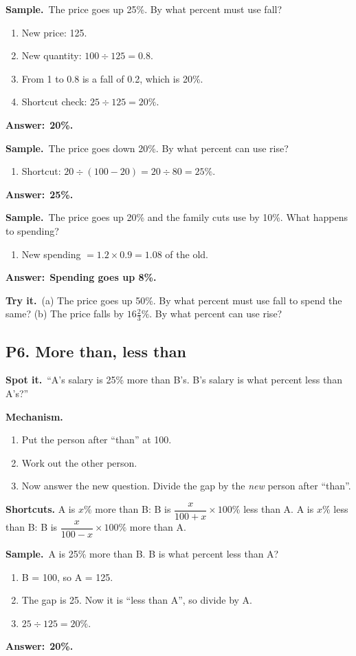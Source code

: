 \documentclass[11pt,a4paper]{article}
\let\oldsubsection\subsection
\renewcommand{\subsection}{\needspace{9\baselineskip}\oldsubsection}
\newcommand{\spot}{\textbf{\color{ember}Spot it.}\ }
\newcommand{\mech}{\textbf{\color{ember}Mechanism.}\ }
\newif\ifkeepsamp
\newcommand{\ans}[1]{\par\nopagebreak\noindent\textbf{\color{ember}Answer:}\ \textbf{#1}\par}
\newcommand{\samp}{\ifkeepsamp\needspace{4\baselineskip}\fi\textbf{\color{ember}Sample.}\ }
\newcommand{\tryit}[1]{\textbf{\color{ember}Try it.}\ #1}
\begin{document}
\samp The price goes up 25\%. By what percent must use fall?
\begin{enumerate}
\item New price: 125.
\item New quantity: $100 \div 125 = 0.8$.
\item From 1 to 0.8 is a fall of 0.2, which is 20\%.
\item Shortcut check: $25 \div 125 = 20\%$.
\end{enumerate}
\ans{20\%.}

\samp The price goes down 20\%. By what percent can use rise?
\begin{enumerate}
\item Shortcut: $20 \div (100 - 20) = 20 \div 80 = 25\%$.
\end{enumerate}
\ans{25\%.}

\samp The price goes up 20\% and the family cuts use by 10\%. What happens to spending?
\begin{enumerate}
\item New spending $= 1.2 \times 0.9 = 1.08$ of the old.
\end{enumerate}
\ans{Spending goes up 8\%.}

\tryit (a) The price goes up 50\%. By what percent must use fall to spend the same? (b) The price falls by $16\tfrac23\%$. By what percent can use rise?

\subsection{P6. More than, less than}
\spot ``A's salary is 25\% more than B's. B's salary is what percent less than A's?''

\mech
\begin{enumerate}
\item Put the person after ``than'' at 100.
\item Work out the other person.
\item Now answer the new question. Divide the gap by the \emph{new} person after ``than''.
\end{enumerate}
\textbf{Shortcuts.} A is $x\%$ more than B: B is $\dfrac{x}{100+x}\times 100\%$ less than A. A is $x\%$ less than B: B is $\dfrac{x}{100-x}\times 100\%$ more than A.

\samp A is 25\% more than B. B is what percent less than A?
\begin{enumerate}
\item B = 100, so A = 125.
\item The gap is 25. Now it is ``less than A'', so divide by A.
\item $25 \div 125 = 20\%$.
\end{enumerate}
\ans{20\%.}
\end{document}
